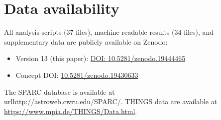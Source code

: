 \documentclass[fleqn,usenatbib]{mnras}
\begin{document}
\section*{Data availability}

All analysis scripts (37 files), machine-readable results (34 files), and supplementary data are publicly available on Zenodo:
\begin{itemize}
\item Version 13 (this paper): \href{https://doi.org/10.5281/zenodo.19444465}{DOI: 10.5281/zenodo.19444465}
\item Concept DOI: \href{https://doi.org/10.5281/zenodo.19430633}{10.5281/zenodo.19430633}
\end{itemize}
The SPARC database is available at \\url{http://astroweb.cwru.edu/SPARC/}.
THINGS data are available at \url{https://www.mpia.de/THINGS/Data.html}.





\bsp
\label{lastpage}
\end{document}
